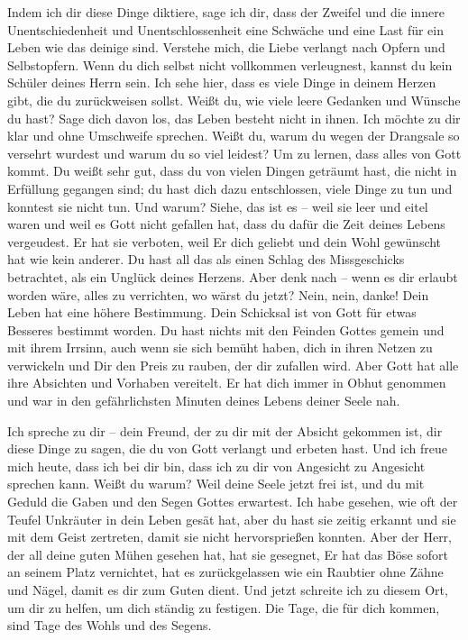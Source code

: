 Indem ich dir diese Dinge diktiere, sage ich dir, dass der Zweifel und die innere Unentschiedenheit und Unentschlossenheit eine Schwäche und eine Last für ein Leben wie das deinige sind. Verstehe mich, die Liebe verlangt nach Opfern und Selbstopfern. Wenn du dich selbst nicht vollkommen verleugnest, kannst du kein Schüler deines Herrn sein. Ich sehe hier, dass es viele Dinge in deinem Herzen gibt, die du zurückweisen sollst. Weißt du, wie viele leere Gedanken und Wünsche du hast? Sage dich davon los, das Leben besteht nicht in ihnen. Ich möchte zu dir klar und ohne Umschweife sprechen. Weißt du, warum du wegen der Drangsale so versehrt wurdest und warum du so viel leidest? Um zu lernen, dass alles von Gott kommt. Du weißt sehr gut, dass du von vielen Dingen geträumt hast, die nicht in Erfüllung gegangen sind; du hast dich dazu entschlossen, viele Dinge zu tun und konntest sie nicht tun. Und warum? Siehe, das ist es -- weil sie leer und eitel waren und weil es Gott nicht gefallen hat, dass du dafür die Zeit deines Lebens vergeudest. Er hat sie verboten, weil Er dich geliebt und dein Wohl gewünscht hat wie kein anderer. Du hast all das als einen Schlag des Missgeschicks betrachtet, als ein Unglück deines Herzens. Aber denk nach -- wenn es dir erlaubt worden wäre, alles zu verrichten, wo wärst du jetzt? Nein, nein, danke! Dein Leben hat eine höhere Bestimmung. Dein Schicksal ist von Gott für etwas Besseres bestimmt worden. Du hast nichts mit den Feinden Gottes gemein und mit ihrem Irrsinn, auch wenn sie sich bemüht haben, dich in ihren Netzen zu verwickeln und Dir den Preis zu rauben, der dir zufallen wird. Aber Gott hat alle ihre Absichten und Vorhaben vereitelt. Er hat dich immer in Obhut genommen und war in den gefährlichsten Minuten deines Lebens deiner Seele nah.

Ich spreche zu dir -- dein Freund, der zu dir mit der Absicht gekommen ist, dir diese Dinge zu sagen, die du von Gott verlangt und erbeten hast. Und ich freue mich heute, dass ich bei dir bin, dass ich zu dir von Angesicht zu Angesicht sprechen kann. Weißt du warum? Weil deine Seele jetzt frei ist, und du mit Geduld die Gaben und den Segen Gottes erwartest. Ich habe gesehen, wie oft der Teufel Unkräuter in dein Leben gesät hat, aber du hast sie zeitig erkannt und sie mit dem Geist zertreten, damit sie nicht hervorsprießen konnten. Aber der Herr, der all deine guten Mühen gesehen hat, hat sie gesegnet, Er hat das Böse sofort an seinem Platz vernichtet, hat es zurückgelassen wie ein Raubtier ohne Zähne und Nägel, damit es dir zum Guten dient. Und jetzt schreite ich zu diesem Ort, um dir zu helfen, um dich ständig zu festigen. Die Tage, die für dich kommen, sind Tage des Wohls und des Segens.


